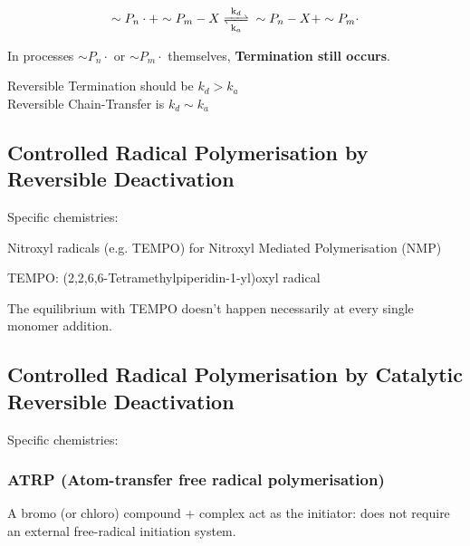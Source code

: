 \documentclass{NoteThesis/note-thesis}
\begin{document}
$$
\sim P_n \cdot + \sim P_m-X \ce{<=>[k_d][k_a]} \sim P_n-X + \sim P_m \cdot
$$

In processes $\sim P_n \cdot$ or $\sim P_m \cdot$ themselves, \textbf{Termination still occurs}.

\begin{mynote_env}[frametitle=To be effective]
    Reversible Termination should be $k_d > k_a$\\
    Reversible Chain-Transfer is $k_d \sim  k_a$
\end{mynote_env}

\newpage
\subsection[CRP by Reversible Deactivation]{Controlled Radical Polymerisation by Reversible Deactivation}

Specific chemistries:

Nitroxyl radicals (e.g. TEMPO) for Nitroxyl Mediated Polymerisation (NMP)


TEMPO: (2,2,6,6-Tetramethylpiperidin-1-yl)oxyl radical

\begin{mynote_env}[frametitle=Note]
    The equilibrium with TEMPO doesn't happen necessarily at every single monomer addition.
\end{mynote_env}

\subsection[CRP by Catalytic Reversible Deactivation]{Controlled Radical Polymerisation by Catalytic Reversible Deactivation}

Specific chemistries:

\subsubsection*{ATRP (Atom-transfer free radical polymerisation)}

A bromo (or chloro) compound +  complex act as the initiator: does not require an external free-radical initiation system.

\begin{center}
\end{center}
\end{document}
